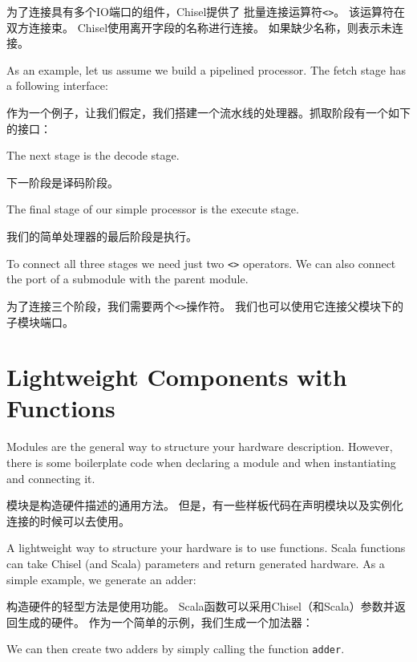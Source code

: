 \documentclass[%
    10pt,
    headinclude, footexclude,
    openright, %
    notitlepage,
    cleardoubleempty,
    headsepline,
    pointlessnumbers,
    bibtotoc, idxtotoc,
    ]{scrbook}
\newcommand{\code}[1]{{\small{\texttt{#1}}}}
\begin{document}
为了连接具有多个IO端口的组件，Chisel提供了
批量连接运算符\code{<>}。 该运算符在双方连接束。 Chisel使用离开字段的名称进行连接。
如果缺少名称，则表示未连接。


As an example, let us assume we build a pipelined processor. The fetch
stage has a following interface:

作为一个例子，让我们假定，我们搭建一个流水线的处理器。抓取阶段有一个如下的接口：


\noindent The next stage is the decode stage.

\noindent 下一阶段是译码阶段。


\noindent The final stage of our simple processor is the execute stage.

\noindent 我们的简单处理器的最后阶段是执行。


To connect all three stages we need just two \code{<>} operators.
We can also connect the port of a submodule with the parent module.

为了连接三个阶段，我们需要两个\code{<>}操作符。
我们也可以使用它连接父模块下的子模块端口。




\section{Lightweight Components with Functions}

Modules are the general way to structure your hardware description.
However, there is some boilerplate code when declaring a module and when instantiating and
connecting it.


模块是构造硬件描述的通用方法。
但是，有一些样板代码在声明模块以及实例化连接的时候可以去使用。

A lightweight way to structure your hardware is to use functions.
Scala functions can take Chisel (and Scala) parameters and return generated hardware.
As a simple example, we generate an adder:

构造硬件的轻型方法是使用功能。
Scala函数可以采用Chisel（和Scala）参数并返回生成的硬件。
作为一个简单的示例，我们生成一个加法器：


\noindent We can then create two adders by simply calling the function \code{adder}.
\end{document}
